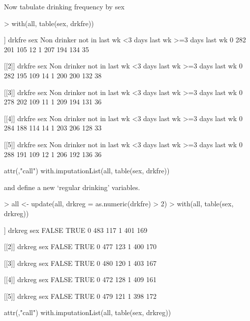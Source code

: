 \documentclass[12pt]{article}
\begin{document}
Now tabulate drinking frequency by sex
\begin{Schunk}
\begin{Sinput}
> with(all, table(sex, drkfre))
\end{Sinput}
\begin{Soutput}
[[1]]
   drkfre
sex Non drinker not in last wk <3 days last wk >=3 days last wk
  0 282         201            105              12             
  1 207         194            134              35             

[[2]]
   drkfre
sex Non drinker not in last wk <3 days last wk >=3 days last wk
  0 282         195            109              14             
  1 200         200            132              38             

[[3]]
   drkfre
sex Non drinker not in last wk <3 days last wk >=3 days last wk
  0 278         202            109              11             
  1 209         194            131              36             

[[4]]
   drkfre
sex Non drinker not in last wk <3 days last wk >=3 days last wk
  0 284         188            114              14             
  1 203         206            128              33             

[[5]]
   drkfre
sex Non drinker not in last wk <3 days last wk >=3 days last wk
  0 288         191            109              12             
  1 206         192            136              36             

attr(,"call")
with.imputationList(all, table(sex, drkfre))
\end{Soutput}
\end{Schunk}
and define a new `regular drinking' variables.
\begin{Schunk}
\begin{Sinput}
> all <- update(all, drkreg = as.numeric(drkfre) > 2)
> with(all, table(sex, drkreg))
\end{Sinput}
\begin{Soutput}
[[1]]
   drkreg
sex FALSE TRUE
  0 483   117 
  1 401   169 

[[2]]
   drkreg
sex FALSE TRUE
  0 477   123 
  1 400   170 

[[3]]
   drkreg
sex FALSE TRUE
  0 480   120 
  1 403   167 

[[4]]
   drkreg
sex FALSE TRUE
  0 472   128 
  1 409   161 

[[5]]
   drkreg
sex FALSE TRUE
  0 479   121 
  1 398   172 

attr(,"call")
with.imputationList(all, table(sex, drkreg))
\end{Soutput}
\end{Schunk}
\end{document}
